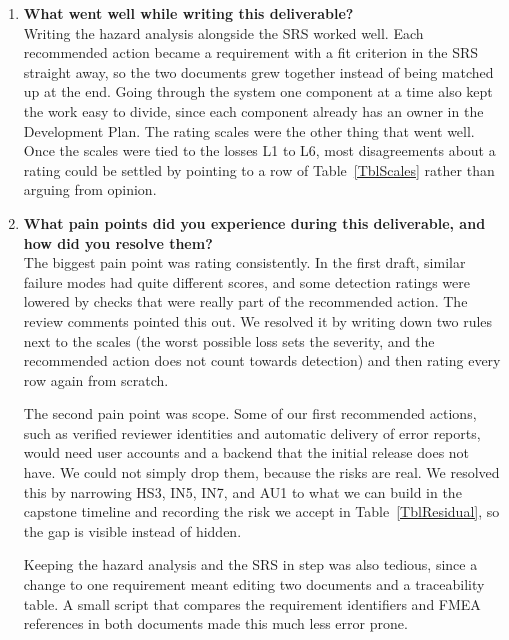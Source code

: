 \documentclass{article}
\begin{document}
\begin{enumerate}
    \item \textbf{What went well while writing this deliverable?}\\
    Writing the hazard analysis alongside the SRS worked well. Each
    recommended action became a requirement with a fit criterion in the SRS
    straight away, so the two documents grew together instead of being
    matched up at the end. Going through the system one component at a time
    also kept the work easy to divide, since each component already has an
    owner in the Development Plan. The rating scales were the other thing
    that went well. Once the scales were tied to the losses L1 to L6, most
    disagreements about a rating could be settled by pointing to a row of
    Table~\ref{TblScales} rather than arguing from opinion.

    \item \textbf{What pain points did you experience during this
    deliverable, and how did you resolve them?}\\
    The biggest pain point was rating consistently. In the first draft,
    similar failure modes had quite different scores, and some detection
    ratings were lowered by checks that were really part of the recommended
    action. The review comments pointed this out. We resolved it by writing
    down two rules next to the scales (the worst possible loss sets the
    severity, and the recommended action does not count towards detection)
    and then rating every row again from scratch.

    The second pain point was scope. Some of our first recommended actions,
    such as verified reviewer identities and automatic delivery of error
    reports, would need user accounts and a backend that the initial release
    does not have. We could not simply drop them, because the risks are real.
    We resolved this by narrowing HS3, IN5, IN7, and AU1 to what we can build
    in the capstone timeline and recording the risk we accept in
    Table~\ref{TblResidual}, so the gap is visible instead of hidden.

    Keeping the hazard analysis and the SRS in step was also tedious, since a
    change to one requirement meant editing two documents and a traceability
    table. A small script that compares the requirement identifiers and FMEA
    references in both documents made this much less error prone.


\end{enumerate}
\end{document}
